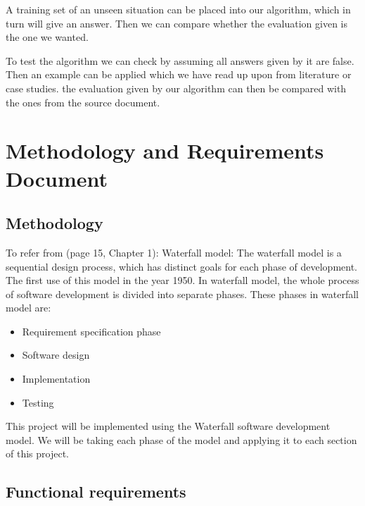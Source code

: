 \documentclass{report}
\begin{document}
A training set of an unseen situation can be placed into our algorithm, which in turn will give an answer. Then we can compare whether the evaluation given is the one we wanted.

To test the algorithm we can check by assuming all answers given by it are false. Then an example can be applied which we have read up upon from literature or case studies. the evaluation given by our algorithm can then be compared with the ones from the source document.




\chapter{Methodology and Requirements Document}
\label{cha:methrecdoc}

\section{Methodology}
\label{sec:meth}

To refer from \cite{Hamlet2001TheEngineeringofSoftware}(page 15, Chapter 1): Waterfall model: The waterfall model is a sequential design process, which has distinct goals for each phase of development. The first use of this model in the year 1950. In waterfall model, the whole process of software development is divided into separate phases. These phases in waterfall model are:
\begin{itemize}
\item Requirement specification phase
\item Software design
\item Implementation 
\item Testing 
\end{itemize}

This project will be implemented using the Waterfall software development model. We will be taking each phase of the model and applying it to each section of this project.  


\section{Functional requirements}
\label{sec:functreq}
\end{document}
